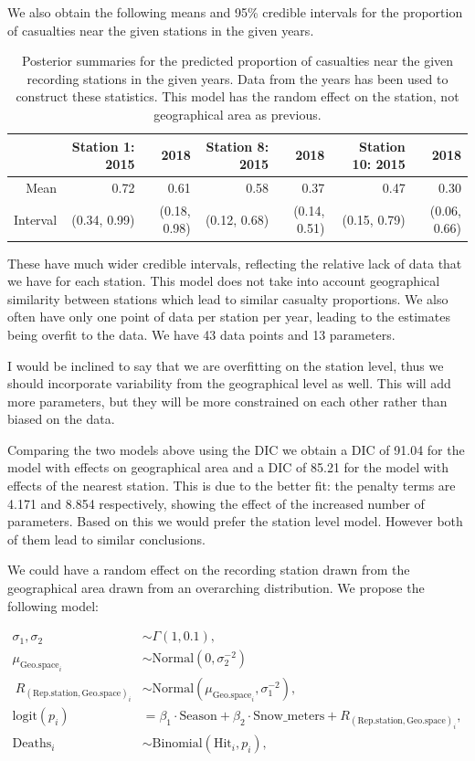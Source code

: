 \documentclass[12pt]{extarticle}
\begin{document}
We also obtain the following means and 95\% credible intervals for the proportion of casualties near the given stations in the given years. 

\begin{table}[H]
	\centering
	\footnotesize
	\begin{tabular}{r|rr|rr|rr}
		\hline
		& Station 1: 2015 & 2018 & Station 8: 2015 & 2018 & Station 10: 2015 & 2018 \\
		\hline
		Mean & 0.72 & 0.61 & 0.58 & 0.37 & 0.47 & 0.30 \\
		Interval & (0.34, 0.99) & (0.18, 0.98) & (0.12, 0.68) & (0.14, 0.51) & (0.15, 0.79) & (0.06, 0.66)\\
		\hline
	\end{tabular}
	\caption{Posterior summaries for the predicted proportion of casualties near the given recording stations in the given years. Data from the years has been used to construct these statistics. This model has the random effect on the station, not geographical area as previous.}
	\label{tab:postprop_stat}
\end{table}

These have much wider credible intervals, reflecting the relative lack of data that we have for each station. This model does not take into account geographical similarity between stations which lead to similar casualty proportions. We also often have only one point of data per station per year, leading to the estimates being overfit to the data. We have 43 data points and 13 parameters. 

I would be inclined to say that we are overfitting on the station level, thus we should incorporate variability from the geographical level as well. This will add more parameters, but they will be more constrained on each other rather than biased on the data.

Comparing the two models above using the DIC we obtain a DIC of 91.04 for the model with effects on geographical area and a DIC of 85.21 for the model with effects of the nearest station. This is due to the better fit: the penalty terms are 4.171 and 8.854 respectively, showing the effect of the increased number of parameters. Based on this we would prefer the station level model. However both of them lead to similar conclusions.

We could have a random effect on the recording station drawn from the geographical area drawn from an overarching distribution. We propose the following model:

\begin{align*}
\sigma_1, \sigma_2 &\sim \Gamma(1, 0.1), \\
\mu_{\mathrm{Geo.space}_i} &\sim \mathrm{Normal}(0, \sigma_2^{-2})\\\
R_{\mathrm{(Rep.station, Geo.space)}_i} &\sim \mathrm{Normal}(\mu_{\mathrm{Geo.space}_i}, \sigma_1^{-2}),\\
\mathrm{logit}(p_i) &= \beta_1 \cdot \mathrm{Season} + \beta_2 \cdot \mathrm{Snow\_meters} + R_{\mathrm{(Rep.station, Geo.space)}_i}, \\
\mathrm{Deaths}_i &\sim \mathrm{Binomial}(\mathrm{Hit}_i, p_i),
\end{align*}
\end{document}
